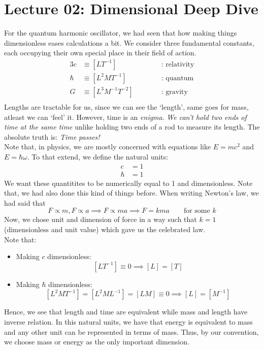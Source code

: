 \section*{Lecture 02: Dimensional Deep Dive}
For the quantum harmonic oscillator, we had seen that how making things dimensionless eases calculations a bit. We consider three fundamental constants, each occupying their own special place in their field of action.
\begin{alignat*}{3}
    c &\equiv [LT^{-1}] &&\qquad \text{ : relativity}\\
    \hbar &\equiv [L^2MT^{-1}] &&\qquad \text{ : quantum}\\
    G &\equiv [L^3M^{-1}T^{-2}] &&\qquad \text{ : gravity}\\
\end{alignat*}
Lengths are tractable for us, since we can see the `length', same goes for mass, atleast we can `feel' it. However, time is an \textit{enigma}. \textit{We can't hold two ends of time at the same time} unlike holding two ends of a rod to measure its length. The absolute truth is: \textit{Time passes!}\\[0.2cm]
Note that, in physics, we are mostly concerned with equations like $E=mc^2$ and $E=\hbar\omega$. To that extend, we define the natural units: 
\begin{align*}
    c &= 1 \\
    \hbar &=1 
\end{align*}
We want these quantitites to be numerically equal to 1 and dimensionless. Note that, we had also done this kind of things before. When writing Newton's law, we had said that $$F\propto m, F\propto a \implies F \propto ma \implies F=kma \qquad \text{for some } k$$
Now, we chose unit and dimension of force in a way such that $k=1$ (dimensionless and unit value) which gave us the celebrated law. \\[0.2cm]
Note that: 
\begin{itemize}
    \item Making $c$ dimensionless: 
    $$[LT^{-1}] \equiv 0 \implies [L] = [T]$$
    \item Making $\hbar$ dimensionless:
    $$[L^2 MT^{-1}] = [L^2M L^{-1}] = [LM] \equiv 0 \implies [L] = [M^{-1}]$$
\end{itemize}
Hence, we see that length and time are equivalent while mass and length have inverse relation. In this natural units, we have that energy is equivalent to mass and any other unit can be represented in terms of mass. Thus, by our convention, we choose mass or energy as the only important dimension.  \\[0.2cm]
